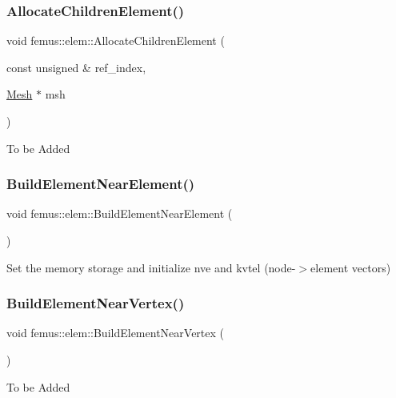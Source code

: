 \subsubsection{\texorpdfstring{Allocate\+Children\+Element()}{AllocateChildrenElement()}}
{\footnotesize\ttfamily void femus\+::elem\+::\+Allocate\+Children\+Element (\begin{DoxyParamCaption}\item[{const unsigned \&}]{ref\+\_\+index,  }\item[{\mbox{\hyperlink{classfemus_1_1_mesh}{Mesh}} $\ast$}]{msh }\end{DoxyParamCaption})}

To be Added \mbox{\label{classfemus_1_1elem_a70ffdf738d2c80a166fe75394d34b682}} 
\subsubsection{\texorpdfstring{Build\+Element\+Near\+Element()}{BuildElementNearElement()}}
{\footnotesize\ttfamily void femus\+::elem\+::\+Build\+Element\+Near\+Element (\begin{DoxyParamCaption}{ }\end{DoxyParamCaption})}

Set the memory storage and initialize nve and kvtel (node-\/$>$element vectors) \mbox{\label{classfemus_1_1elem_acde071b27d18837622099ce90f191d13}} 
\subsubsection{\texorpdfstring{Build\+Element\+Near\+Vertex()}{BuildElementNearVertex()}}
{\footnotesize\ttfamily void femus\+::elem\+::\+Build\+Element\+Near\+Vertex (\begin{DoxyParamCaption}{ }\end{DoxyParamCaption})}

To be Added \mbox{\label{classfemus_1_1elem_a09e3b298b60d3c830a79eccf6096a5b3}} 
